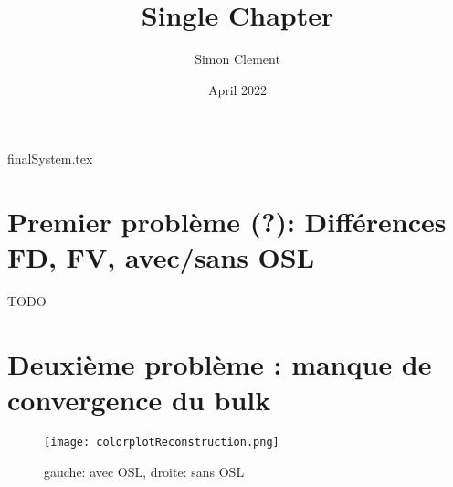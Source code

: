 \documentclass{article}
\title{Single Chapter}
\author{Simon Clement}
\date{April 2022}
\begin{document}
\def\cal{\mathscr}
\tableofcontents
{finalSystem.tex}
\section{Premier problème (?): Différences FD, FV, avec/sans OSL}
TODO
\section{Deuxième problème : manque de convergence du bulk}
\begin{figure}
	\texttt{[image: colorplotReconstruction.png]}
	\caption{gauche: avec OSL, droite: sans OSL}
	\label{fig:colorplotReconstruction}
\end{figure}
\end{document}
